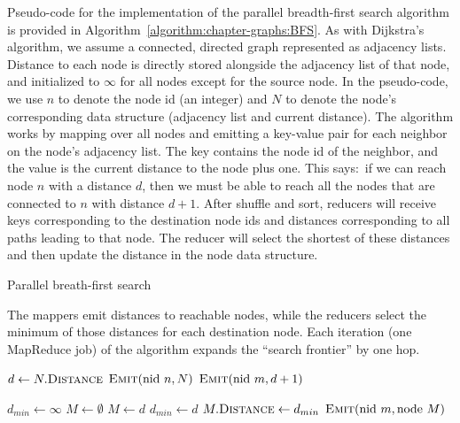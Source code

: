 Pseudo-code for the implementation of the parallel breadth-first
search algorithm is provided in
Algorithm~\ref{algorithm:chapter-graphs:BFS}.  As with Dijkstra's algorithm,
we assume a connected, directed graph represented as adjacency lists.
Distance to each node is directly stored alongside the adjacency list
of that node, and initialized to $\infty$ for all nodes except for the
source node.  In the pseudo-code, we use $n$ to denote the node id (an
integer) and $N$ to denote the node's corresponding data structure
(adjacency list and current distance).  The algorithm works by mapping
over all nodes and emitting a key-value pair for each neighbor on the
node's adjacency list.  The key contains the node id of the neighbor,
and the value is the current distance to the node plus one.  This
says:\ if we can reach node $n$ with a distance $d$, then we must be
able to reach all the nodes that are connected to $n$ with distance
$d+1$.  After shuffle and sort, reducers will receive keys
corresponding to the destination node ids and distances corresponding
to all paths leading to that node.  The reducer will select the
shortest of these distances and then update the distance in the node
data structure.

\begin{algorithm}[t]
\caption{Parallel breath-first search}
\label{algorithm:chapter-graphs:BFS}
The mappers emit distances to reachable nodes, while the reducers
select the minimum of those distances for each destination node.  Each
iteration (one MapReduce job) of the algorithm expands the ``search
frontier'' by one hop.

\algrenewcommand{}
\algrenewcommand{}
  \begin{algorithmic}[1]
    \State $d \gets N.\textsc{Distance}$
    \State $\textsc{Emit}(\textrm{nid }n, N)$
      \State $\textsc{Emit}(\textrm{nid }m, d+1)$
    \EndFor
    \EndProcedure
    \EndFunction
  \end{algorithmic}

  \begin{algorithmic}[1]
    \State $d_{min} \gets \infty$
    \State $M \gets \emptyset$
        \State $M \gets d$
        \State $d_{min} \gets d$
      \EndIf
    \EndFor
    \State $M.\textsc{Distance} \gets d_{min}$
    \State $\textsc{Emit}(\textrm{nid }m, \textrm{node }M)$
    \EndProcedure
    \EndFunction
  \end{algorithmic}
\end{algorithm}

